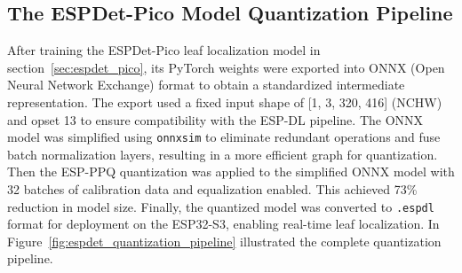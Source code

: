 \subsection{The ESPDet-Pico Model Quantization Pipeline}
\label{subsec:espdet_quantization}
After training the ESPDet-Pico leaf localization model in section~\ref{sec:espdet_pico}, its PyTorch weights were exported into ONNX (Open Neural Network Exchange) format to obtain a standardized intermediate representation. The export used a fixed input shape of [1, 3, 320, 416] (NCHW) and opset 13 to ensure compatibility with the ESP-DL pipeline. The ONNX model was simplified using \texttt{onnxsim} to eliminate redundant operations and fuse batch normalization layers, resulting in a more efficient graph for quantization. Then the ESP-PPQ quantization was applied to the simplified ONNX model with 32 batches of calibration data and equalization enabled. This achieved 73\% reduction in model size. Finally, the quantized model was converted to \texttt{.espdl} format for deployment on the ESP32-S3, enabling real-time leaf localization. In Figure~\ref{fig:espdet_quantization_pipeline} illustrated the complete quantization pipeline.

